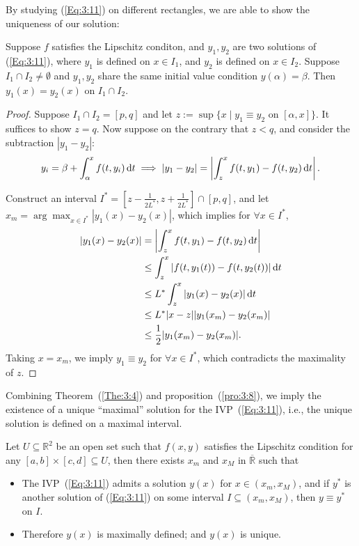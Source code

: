 By studying (\ref{Eq:3:11}) on different rectangles, we are able to show the uniqueness of our solution:

\begin{proposition}\label{pro:3:8}
Suppose $f$ satisfies the Lipschitz conditon, and $y_1,y_2$ are two solutions of (\ref{Eq:3:11}), 
where $y_1$ is defined on $x\in I_1$, and $y_2$ is defined on $x\in I_2$. Suppose $I_1\cap I_2\ne\emptyset$ and $y_1,y_2$ share the same initial value condition $y(\alpha)=\beta$. Then $y_1(x)=y_2(x)$ on $I_1\cap I_2$.
\end{proposition}

\begin{proof}
Suppose $I_1\cap I_2=[p,q]$ and let $z:=\sup\{x\mid y_1\equiv y_2\text{ on }[\alpha,x]\}$. It suffices to show $z=q$. Now suppose on the contrary that $z<q$, and consider the subtraction $|y_1-y_2|$:
\[
y_i=\beta+\int_\alpha^xf(t,y_i)\,\mathrm{d} t\implies
|y_1-y_2|=\left|\int_z^xf(t,y_1)-f(t,y_2)\,\mathrm{d} t\right|.
\]

Construct an interval $I^*=[z-\frac{1}{2L^*},z+\frac{1}{2L^*}]\cap[p,q]$, and let $x_m=\arg\max_{x\in I^*}|y_1(x)-y_2(x)|$, which implies for $\forall x\in I^*$,
\begin{align*}
|y_1(x)-y_2(x)|&
=\left|\int_z^xf(t,y_1)-f(t,y_2)\,\mathrm{d} t\right|\\
&\le \int_z^x|f(t,y_1(t))-f(t,y_2(t))|\,\mathrm{d} t\\
&\le L^*\int_z^x|y_1(x)-y_2(x)|\,\mathrm{d} t\\
&\le L^*|x-z||y_1(x_m)-y_2(x_m)|\\
&\le \frac{1}{2}|y_1(x_m)-y_2(x_m)|.
\end{align*}
Taking $x=x_m$, we imply $y_1\equiv y_2$ for $\forall x\in I^*$, which contradicts the maximality of $z$.
\end{proof}

Combining Theorem~(\ref{The:3:4}) and proposition~(\ref{pro:3:8}), we imply the existence of a unique ``maximal'' solution for the IVP~(\ref{Eq:3:11}), i.e., the unique solution is defined on a maximal interval.

\begin{corollary}
Let $U\subseteq\mathbb{R}^2$ be an open set such that 
$f(x,y)$ satisfies the Lipschitz condition for any $[a,b]\times[c,d]\subseteq U$, 
then there exists $x_m$ and $x_M$ in $\overline{\mathbb{R}}$ such that
\begin{itemize}
\item
The IVP~(\ref{Eq:3:11}) admits a solution $y(x)$ for $x\in(x_m,x_M)$, and if $y^*$ is another solution of (\ref{Eq:3:11}) on some interval $I\subseteq(x_m,x_M)$, then $y\equiv y^*$ on $I$.
\item
Therefore $y(x)$ is maximally defined; and $y(x)$ is unique.
\end{itemize}
\end{corollary}


